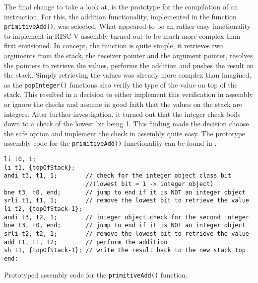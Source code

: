 The final change to take a look at, is the prototype for the compilation of an instruction. For this, the addition functionality, implemented in the function \texttt{primitiveAdd()}, was selected. What appeared to be an rather easy functionality to implement in RISC-V assembly turned out to be much more complex than first envisioned. 
In concept, the function is quite simple, it retrieves two arguments from the stack, the receiver pointer and the argument pointer, resolves the pointers to retrieve the values, performs the addition and pushes the result on the stack. 
Simply retrieving the values was already more complex than imagined, as the \texttt{popInteger()} functions also verify the type of the value on top of the stack.
This resulted in a decision to either implement this verification in assembly or ignore the checks and assume in good faith that the values on the stack are integers.
After further investigation, it turned out that the integer check boils down to a check of the lowest bit being 1. This finding made the decision choose the safe option and implement the check in assembly quite easy. 
The prototype assembly code for the \texttt{primitiveAdd()} functionality can be found in .
\begin{listing}[h]
\begin{verbatim}
li t0, 1;
li t1, {topOfStack};
andi t3, t1, 1;        // check for the integer object class bit 
                       //(lowest bit = 1 -> integer object)
bne t3, t0, end;       // jump to end if it is NOT an integer object
srli t1, t1, 1;        // remove the lowest bit to retrieve the value
li t2, {topOfStack-1};
andi t3, t2, 1;        // integer object check for the second integer
bne t3, t0, end;       // jump to end if it is NOT an integer object
srli t2, t2, 1;        // remove the lowest bit to retrieve the value
add t1, t1, t2;        // perform the addition
sh t1, {topOfStack-1}; // write the result back to the new stack top
end: 
\end{verbatim}
\caption{Prototyped assembly code for the \texttt{primitiveAdd()} function.}
\label{lst:primitiveAddAsm}
\end{listing}

